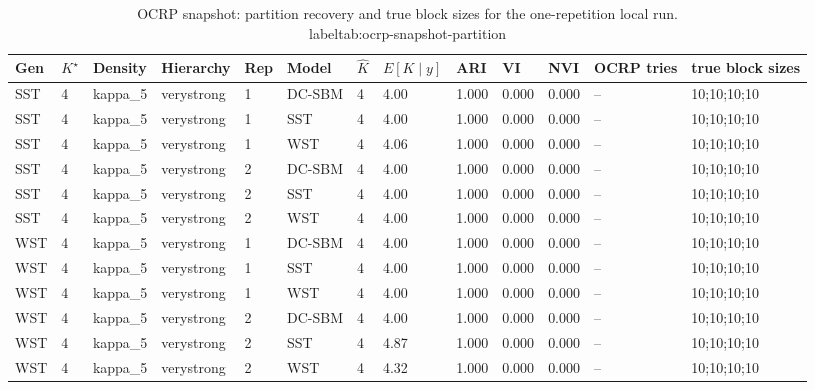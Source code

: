 \begin{table}[!h]
\centering
\caption{OCRP snapshot: partition recovery and true block sizes for the one-repetition local run.\\label{tab:ocrp-snapshot-partition}}
\centering
\begin{tabular}[t]{lllllllllllll}
\toprule
Gen & $K^\star$ & Density & Hierarchy & Rep & Model & $\hat K$ & $E[K\mid y]$ & ARI & VI & NVI & OCRP tries & true block sizes\\
\midrule
SST & 4 & kappa_5 & verystrong & 1 & DC-SBM & 4 & 4.00 & 1.000 & 0.000 & 0.000 & -- & 10;10;10;10\\
SST & 4 & kappa_5 & verystrong & 1 & SST & 4 & 4.00 & 1.000 & 0.000 & 0.000 & -- & 10;10;10;10\\
SST & 4 & kappa_5 & verystrong & 1 & WST & 4 & 4.06 & 1.000 & 0.000 & 0.000 & -- & 10;10;10;10\\
SST & 4 & kappa_5 & verystrong & 2 & DC-SBM & 4 & 4.00 & 1.000 & 0.000 & 0.000 & -- & 10;10;10;10\\
SST & 4 & kappa_5 & verystrong & 2 & SST & 4 & 4.00 & 1.000 & 0.000 & 0.000 & -- & 10;10;10;10\\
SST & 4 & kappa_5 & verystrong & 2 & WST & 4 & 4.00 & 1.000 & 0.000 & 0.000 & -- & 10;10;10;10\\
WST & 4 & kappa_5 & verystrong & 1 & DC-SBM & 4 & 4.00 & 1.000 & 0.000 & 0.000 & -- & 10;10;10;10\\
WST & 4 & kappa_5 & verystrong & 1 & SST & 4 & 4.00 & 1.000 & 0.000 & 0.000 & -- & 10;10;10;10\\
WST & 4 & kappa_5 & verystrong & 1 & WST & 4 & 4.00 & 1.000 & 0.000 & 0.000 & -- & 10;10;10;10\\
WST & 4 & kappa_5 & verystrong & 2 & DC-SBM & 4 & 4.00 & 1.000 & 0.000 & 0.000 & -- & 10;10;10;10\\
WST & 4 & kappa_5 & verystrong & 2 & SST & 4 & 4.87 & 1.000 & 0.000 & 0.000 & -- & 10;10;10;10\\
WST & 4 & kappa_5 & verystrong & 2 & WST & 4 & 4.32 & 1.000 & 0.000 & 0.000 & -- & 10;10;10;10\\
\bottomrule
\end{tabular}
\end{table}
